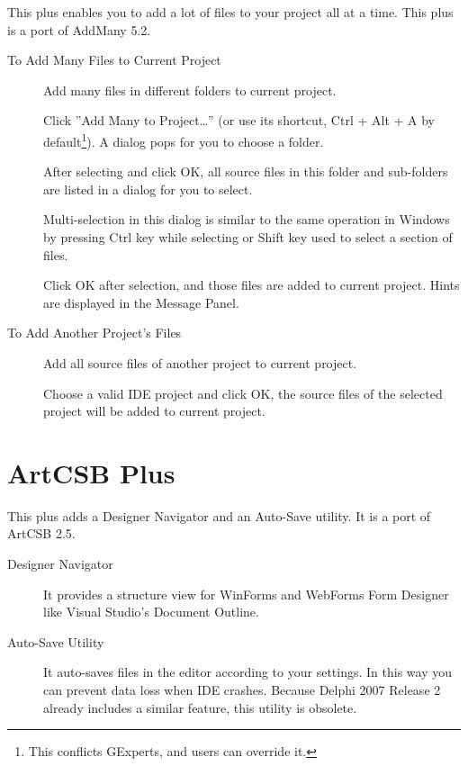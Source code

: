 This plus enables you to add a lot of files to your project all at a time. This
plus is a port of AddMany 5.2.

\begin{description}
\item[To Add Many Files to Current Project] Add many files in different folders
to current project.

Click ''Add Many to Project\dots'' (or use its shortcut,
Ctrl + Alt + A by default\footnote{This conflicts GExperts, and users can
override it.}). A dialog pops for you to choose a folder.


After selecting and click OK, all source files in this folder and sub-folders
are listed in a dialog for you to select.

Multi-selection in this dialog is similar to the same operation in Windows by
pressing Ctrl key while selecting or Shift key used to select a section of
files.


Click OK after selection, and those files are added to current project. Hints
are displayed in the Message Panel.

\item [To Add Another Project's Files] Add all source files of another project
to current project.

Choose a valid IDE project and click OK, the source files of the selected
project will be added to current project.


\end{description}

\section{ArtCSB Plus}

This plus adds a Designer Navigator and an Auto-Save utility. It is a port of
ArtCSB 2.5.

\begin{description}
  \item[Designer Navigator] It provides a structure view for WinForms and
  WebForms Form Designer like Visual Studio's Document Outline.

  \item[Auto-Save Utility] It auto-saves files in the editor according to your
  settings. In this way you can prevent data loss when IDE crashes. Because
  Delphi 2007 Release 2 already includes a similar feature, this utility is
  obsolete.
\end{description}

